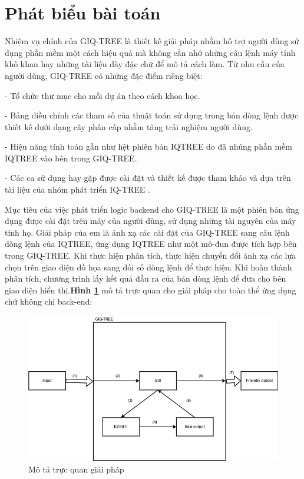 \documentclass[12pt]{report}
\begin{document}
\section{Phát biểu bài toán}
Nhiệm vụ chính của GIQ-TREE là thiết kế giải pháp nhằm hỗ trợ người dùng sử dụng phần mềm một cách hiệu quả mà không cần nhớ những câu lệnh máy tính khô khan hay những tài liệu dày đặc chữ để mô tả cách làm. Từ nhu cầu của người dùng, GIQ-TREE có những đặc điểm riêng biệt:

- Tổ chức thư mục cho mỗi dự án theo cách khoa học.

- Bảng điều chỉnh các tham số của thuật toán sử dụng trong bản dòng lệnh được thiết kế dưới dạng cây phân cấp nhằm tăng trải nghiệm người dùng.

- Hiệu năng tính toán gần như hệt phiên bản IQTREE do đã nhúng phần mềm IQTREE vào bên trong GIQ-TREE.

- Các ca sử dụng hay gặp được cài đặt và thiết kế được tham khảo và dựa trên tài liệu của nhóm phát triển IQ-TREE \cite{cia-18}.

Mục tiêu của việc phát triển logic backend cho GIQ-TREE là một phiên bản ứng dụng được cài đặt trên máy của người dùng, sử dụng những tài nguyên của máy tính họ. Giải pháp của em là ánh xạ các cài đặt của GIQ-TREE sang câu lệnh dòng lệnh của IQTREE, ứng dụng IQTREE như một mô-đun được tích hợp bên trong GIQ-TREE. Khi thực hiện phân tích, thực hiện chuyển đổi ánh xạ các lựa chọn trên giao diện đồ họa sang đối số dòng lệnh để thực hiện. Khi hoàn thành phân tích, chương trình lấy kết quả đầu ra của bản dòng lệnh để đưa cho bên giao diện hiển thị.\textbf{Hình \ref{fig:image1.3} } mô tả trực quan cho giải pháp cho toàn thể ứng dụng chứ không chỉ back-end:

\begin{figure}[h]
	\centering
	\includegraphics[scale=0.55]{Image/1.3.png}
	\caption{Mô tả trực quan giải pháp}
	\label{fig:image1.3}
\end{figure}
\end{document}
